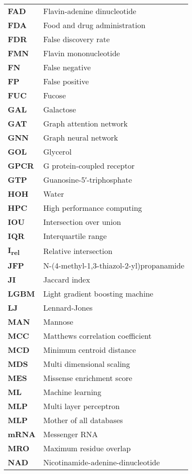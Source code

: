 \begin{longtable}[l]{@{}p{2.5cm}p{12cm}@{}}
\textbf{FAD} & Flavin-adenine dinucleotide \\
\textbf{FDA} & Food and drug administration \\
\textbf{FDR} & False discovery rate \\
\textbf{FMN} & Flavin mononucleotide \\
\textbf{FN} & False negative \\
\textbf{FP} & False positive \\
\textbf{FUC} & Fucose \\
\textbf{GAL} & Galactose \\
\textbf{GAT} & Graph attention network \\
\textbf{GNN} & Graph neural network \\
\textbf{GOL} & Glycerol \\
\textbf{GPCR} & G protein-coupled receptor\\
\textbf{GTP} & Guanosine-5′-triphosphate \\
\textbf{HOH} & Water \\
\textbf{HPC} & High performance computing \\
\textbf{IOU} & Intersection over union \\
\textbf{IQR} & Interquartile range \\
\textbf{I\textsubscript{rel}} & Relative intersection \\
\textbf{JFP} & N-(4-methyl-1,3-thiazol-2-yl)propanamide \\
\textbf{JI} & Jaccard index \\
\textbf{LGBM} & Light gradient boosting machine \\
\textbf{LJ} & Lennard-Jones \\
\textbf{MAN} & Mannose \\
\textbf{MCC} & Matthews correlation coefficient \\
\textbf{MCD} & Minimum centroid distance \\
\textbf{MDS} & Multi dimensional scaling \\
\textbf{MES} & Missense enrichment score \\
\textbf{ML} & Machine learning \\
\textbf{MLP} & Multi layer perceptron \\
\textbf{MLP} & Mother of all databases \\
\textbf{mRNA} & Messenger RNA \\
\textbf{MRO} & Maximum residue overlap \\
\textbf{NAD} & Nicotinamide-adenine-dinucleotide \\

\end{longtable}
